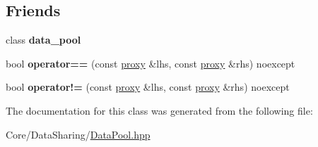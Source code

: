 \subsection*{Friends}
\begin{DoxyCompactItemize}
\item 
\mbox{\label{classsequoia_1_1data__sharing_1_1data__pool_1_1proxy_a81e5e06621ba2384887be5333a1dae91}} 
class {\bfseries data\+\_\+pool}
\item 
\mbox{\label{classsequoia_1_1data__sharing_1_1data__pool_1_1proxy_a628b0bf48f0aa3c68e58d5d43db1d3b3}} 
bool {\bfseries operator==} (const \mbox{\hyperlink{classsequoia_1_1data__sharing_1_1data__pool_1_1proxy}{proxy}} \&lhs, const \mbox{\hyperlink{classsequoia_1_1data__sharing_1_1data__pool_1_1proxy}{proxy}} \&rhs) noexcept
\item 
\mbox{\label{classsequoia_1_1data__sharing_1_1data__pool_1_1proxy_a5bc691d596e4d2c763a507417cfb5ce4}} 
bool {\bfseries operator!=} (const \mbox{\hyperlink{classsequoia_1_1data__sharing_1_1data__pool_1_1proxy}{proxy}} \&lhs, const \mbox{\hyperlink{classsequoia_1_1data__sharing_1_1data__pool_1_1proxy}{proxy}} \&rhs) noexcept
\end{DoxyCompactItemize}


The documentation for this class was generated from the following file\+:\begin{DoxyCompactItemize}
\item 
Core/\+Data\+Sharing/\mbox{\hyperlink{_data_pool_8hpp}{Data\+Pool.\+hpp}}\end{DoxyCompactItemize}
